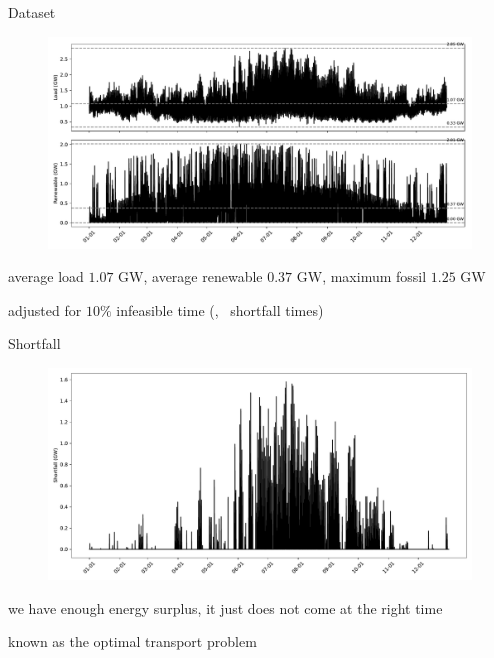 \documentclass[aspectratio=169,11pt]{beamer}
\begin{document}
\begin{frame}{Dataset}
	
\begin{figure}
\centering
\includegraphics[width=0.8\columnwidth]{./figures/load_renewable.pdf}
\end{figure}

\BIT
\item average load $1.07$ GW, average renewable $0.37$ GW, maximum fossil $1.25$ GW
\item adjusted for $10\%$ infeasible time (\ie, \ shortfall times)
\EIT
	
\end{frame}

\begin{frame}{Shortfall}
	
\begin{figure}
\centering
\includegraphics[width=0.8\columnwidth]{./figures/shortfall.pdf}
\end{figure}

\BIT
\item we have enough energy surplus, it just does not come at the right time
\item known as the optimal transport problem
\EIT
\end{frame}
\end{document}
